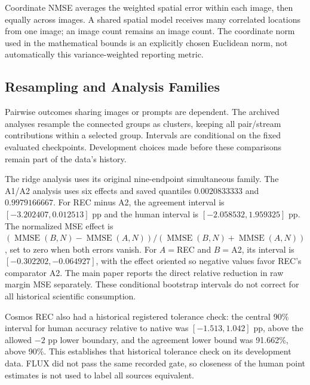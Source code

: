 \documentclass[10pt,twocolumn,letterpaper]{article}
\begin{document}
Coordinate NMSE averages the weighted spatial error within each image, then equally across images. A shared spatial model receives many correlated locations from one image; an image count remains an image count. The coordinate norm used in the mathematical bounds is an explicitly chosen Euclidean norm, not automatically this variance-weighted reporting metric.

\subsection{Resampling and Analysis Families}
Pairwise outcomes sharing images or prompts are dependent. The archived analyses resample the connected groups as clusters, keeping all pair/stream contributions within a selected group. Intervals are conditional on the fixed evaluated checkpoints. Development choices made before these comparisons remain part of the data's history.

The ridge analysis uses its original nine-endpoint simultaneous family. The A1/A2 analysis uses six effects and saved quantiles $0.0020833333$ and $0.9979166667$. For REC minus A2, the agreement interval is $[-3.202407,0.012513]$ pp and the human interval is $[-2.058532,1.959325]$ pp. The normalized MSE effect is $(\operatorname{MMSE}(B,N)-\operatorname{MMSE}(A,N))/(\operatorname{MMSE}(B,N)+\operatorname{MMSE}(A,N))$, set to zero when both errors vanish. For $A=$REC and $B=$A2, its interval is $[-0.302202,-0.064927]$, with the effect oriented so negative values favor REC's comparator A2. The main paper reports the direct relative reduction in raw margin MSE separately. These conditional bootstrap intervals do not correct for all historical scientific consumption.

Cosmos REC also had a historical registered tolerance check: the central 90\% interval for human accuracy relative to native was $[-1.513,1.042]$ pp, above the allowed $-2$ pp lower boundary, and the agreement lower bound was 91.662\%, above 90\%. This establishes that historical tolerance check on its development data. FLUX did not pass the same recorded gate, so closeness of the human point estimates is not used to label all sources equivalent.
\end{document}
